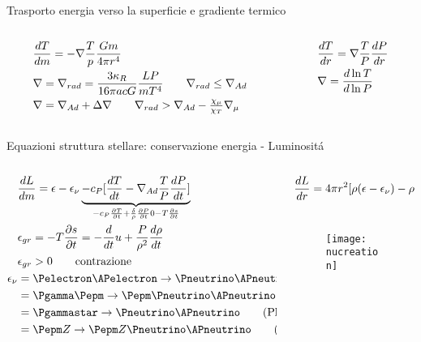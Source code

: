 \begin{frame}{Trasporto energia verso la superficie e gradiente termico}
\begin{columns}[T]
	\begin{column}{0.6\textwidth}
		\begin{align*}
		&\TDy{m}{T}=-\nabla\frac{T}{p}\frac{Gm}{4\pi r^4}\\
		&\nabla=\nrad=\frac{3\kappa_R}{16\pi acG}\frac{LP}{mT^4}\tag*{$\nrad\leq\nad$}\\
		&\nabla=\nad+\Delta\nabla\tag*{$\nrad>\nad-\frac{\chi_{\mu}}{\chi_T}\nmu$}
		\end{align*}
	\end{column}\begin{column}{0.4\textwidth}
		\begin{align*}
		&\TDy{r}{T}=\nabla\frac{T}{P}\TDy{r}{P}\\
		&\nabla=\TDly{P}{T}
		\end{align*}
	\end{column}
\end{columns}
\end{frame}


\begin{frame}{Equazioni struttura stellare: conservazione energia - Luminosit\'a}
\begin{columns}[T]
\begin{column}{0.4\textwidth}
\begin{align*}
&\TDy{m}{L}=\epsilon-\epsilon_{\nu} \underbrace{-c_P[\TDy{t}{T}-\nad\frac{T}{P}\TDy{t}{P}]}_{-c_P\PDy{t}{T}+\frac{\delta}{\rho}\PDy{t}{P}0-T\PDy{t}{s}}\\
&\epsilon_{gr}=-T\PDy{t}{s}=-\TDof{t}u+\frac{P}{\rho^2}\TDy{t}{\rho}\\
&\epsilon_{gr}>0\tag*{contrazione}\\
\epsilon_{\nu}&=\Pelectron\APelectron\to\Pneutrino\APneutrino\tag{Pair annihilation}\\
&=\Pgamma\Pepm\to\Pepm\Pneutrino\APneutrino\tag{Photoproduction}\\
&=\Pgammastar\to\Pneutrino\APneutrino\tag{Plasmon decay}\\
&=\Pepm Z\to\Pepm Z\Pneutrino\APneutrino\tag{Bremsstahlung}\\
    \end{align*}

\end{column}\begin{column}{0.6\textwidth}
\begin{align*}
&\TDy{r}{L}=4\pi r^2[\rho(\epsilon-\epsilon_{\nu})-\rho\TDof{t}u+\frac{P}{\rho}\TDy{t}{\rho}]\\
&
\end{align*}
\begin{figure}[!ht]
            \centering
            \texttt{[image: nucreation]}
            \label{fig:nucreation}
        \end{figure}
\end{column}
\end{columns}
\end{frame}

